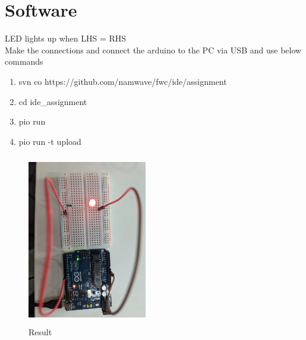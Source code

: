 \documentclass[letterpaper, 10 pt, conference]{ieeeconf}
\begin{document}
\section{Software}
LED lights up when LHS = RHS\\
\vspace{1mm} %
Make the connections and connect the arduino to the PC via USB and use below commands
\begin{enumerate}
\item svn co https://github.com/namwave/fwc/ide/assignment
\item cd ide\_assignment
\item pio run
\item pio run \--t upload

\end{enumerate}
\begin{figure}[ht]
\centering
\includegraphics[width=5.2cm, height=7.5cm, angle=90]{result.jpg}
\caption{Result}
\label{fig:result_picture}
\end{figure}


\addtolength{\textheight}{-12cm}   %
\end{document}
